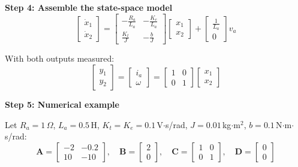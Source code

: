 \begin{example}
\textbf{Step 4: Assemble the state-space model}
\begin{equation}
\begin{bmatrix} \dot{x}_1 \\ \dot{x}_2 \end{bmatrix} = \begin{bmatrix} -\frac{R_a}{L_a} & -\frac{K_e}{L_a} \\ \frac{K_t}{J} & -\frac{b}{J} \end{bmatrix} \begin{bmatrix} x_1 \\ x_2 \end{bmatrix} + \begin{bmatrix} \frac{1}{L_a} \\ 0 \end{bmatrix} v_a
\end{equation}

With both outputs measured:
\begin{equation}
\begin{bmatrix} y_1 \\ y_2 \end{bmatrix} = \begin{bmatrix} i_a \\ \omega \end{bmatrix} = \begin{bmatrix} 1 & 0 \\ 0 & 1 \end{bmatrix} \begin{bmatrix} x_1 \\ x_2 \end{bmatrix}
\end{equation}

\textbf{Step 5: Numerical example}

Let $R_a = 1\,\Omega$, $L_a = 0.5$\,H, $K_t = K_e = 0.1$\,V$\cdot$s/rad, $J = 0.01$\,kg$\cdot$m$^2$, $b = 0.1$\,N$\cdot$m$\cdot$s/rad:
\begin{equation}
\mathbf{A} = \begin{bmatrix} -2 & -0.2 \\ 10 & -10 \end{bmatrix}, \quad \mathbf{B} = \begin{bmatrix} 2 \\ 0 \end{bmatrix}, \quad \mathbf{C} = \begin{bmatrix} 1 & 0 \\ 0 & 1 \end{bmatrix}, \quad \mathbf{D} = \begin{bmatrix} 0 \\ 0 \end{bmatrix}
\end{equation}


\end{example}
